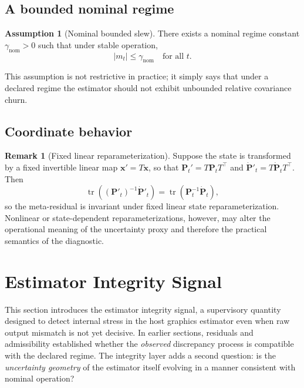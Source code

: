 \documentclass[11pt,letterpaper]{article}
\newcommand{\state}{\mathbf{x}}
\newcommand{\covar}{\mathbf{P}}
\newcommand{\metares}{m}
\newcommand{\trace}{\operatorname{tr}}
\newcommand{\abs}[1]{\left\lvert #1 \right\rvert}
\theoremstyle{gcresult}
\theoremstyle{definition}
\newtheorem{assumption}[theorem]{Assumption}
\newtheorem{remark}[theorem]{Remark}
\begin{document}
\subsection{A bounded nominal regime}
\begin{assumption}[Nominal bounded slew]
There exists a nominal regime constant $\gamma_{\mathrm{nom}} > 0$ such that under stable operation,
\begin{equation}
    \abs{\metares_t} \le \gamma_{\mathrm{nom}} \quad \text{for all } t.
\end{equation}
\end{assumption}

This assumption is not restrictive in practice; it simply says that under a declared regime the estimator should not exhibit unbounded relative covariance churn.

\subsection{Coordinate behavior}
\begin{remark}[Fixed linear reparameterization]
Suppose the state is transformed by a fixed invertible linear map $\state' = T\state$, so that $\covar_t' = T\covar_t T^\top$ and $\dot{\covar}'_t = T\dot{\covar}_t T^\top$. Then
\begin{equation}
    \trace\!\left((\covar'_t)^{-1}\dot{\covar}'_t\right) = \trace(\covar_t^{-1}\dot{\covar}_t),
\end{equation}
so the meta-residual is invariant under fixed linear state reparameterization. Nonlinear or state-dependent reparameterizations, however, may alter the operational meaning of the uncertainty proxy and therefore the practical semantics of the diagnostic.
\end{remark}


\section{Estimator Integrity Signal}
\label{sec:eis}

This section introduces the estimator integrity signal, a supervisory quantity designed to detect internal stress in the host graphics estimator even when raw output mismatch is not yet decisive. In earlier sections, residuals and admissibility established whether the \emph{observed} discrepancy process is compatible with the declared regime. The integrity layer adds a second question: is the \emph{uncertainty geometry} of the estimator itself evolving in a manner consistent with nominal operation?
\end{document}
